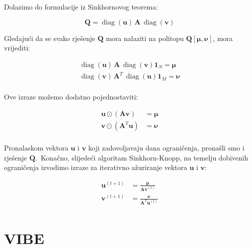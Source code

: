 \documentclass[diplomskirad]{fer}
\begin{document}
Dolazimo do formulacije iz Sinkhornovog teorema:

\begin{equation}
  \bm{Q} = \operatorname{diag}(\bm{u})\,\bm{A}\,\operatorname{diag}(\bm{v})
  \label{eq:sk_q_formula}
\end{equation}

Gledajući da se svako rješenje $\bm{Q}$ mora nalaziti na politopu $\bm{Q}\left[ \bm{\mu}, \bm{\nu} \right]$, mora vrijediti:

\begin{equation}
  \begin{aligned}
    \operatorname{diag}(\bm{u})\,\bm{A}\,\operatorname{diag}(\bm{v}) \bm{1}_N = \bm{\mu} \\
    \operatorname{diag}(\bm{v})\,\bm{A}^T\,\operatorname{diag}(\bm{u}) \bm{1}_M = \bm{\nu} \\
  \end{aligned}
  \label{eq:sk_conditions}
\end{equation}

Ove izraze možemo dodatno pojednostaviti:

\begin{equation}
  \begin{aligned}
    \bm{u} \odot (\bm{A} \bm{v}) &= \bm{\mu} \\
    \bm{v} \odot (\bm{A}^T \bm{u}) &= \bm{\nu} \\
  \end{aligned}
  \label{eq:sk_conditions_simplified}
\end{equation}

Pronalaskom vektora $\bm{u}$ i $\bm{v}$ koji zadovoljavaju dana ograničenja, pronašli smo i rješenje $\bm{Q}$.\ Konačno, slijedeći algoritam Sinkhorn-Knopp, na temelju dobivenih ograničenja izvodimo izraze za iterativno ažuriranje vektora $\bm{u}$ i $\bm{v}$:

\begin{equation}
  \begin{aligned}
    \bm{u}^{(t + 1)} &= \frac{\bm{\mu}}{\bm{A} \bm{v}^{(t)}} \\
    \bm{v}^{(t + 1)} &= \frac{\bm{\nu}}{\bm{A}^T \bm{u}^{(t)}} \\
  \end{aligned}
  \label{eq:sk_final}
\end{equation}

\chapter{VIBE}
\label{pog:vibe}
\end{document}
